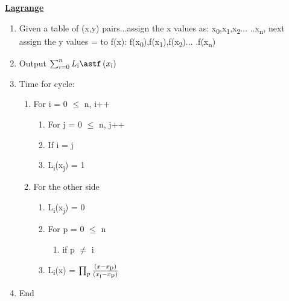 \documentclass[12pt]{article}
\renewcommand{\_}{\kern-1.5pt\textunderscore\kern-1.5pt}
\begin{document}
\textbf{\uline{Lagrange }}\par


\vspace{\baselineskip}
\begin{enumerate}
	\item Given a table of (x,y) pairs...assign the x values as:  x\textsubscript{0},x\textsubscript{1},x\textsubscript{2}$ \ldots $ ..x\textsubscript{n}, next assign the y values = to f(x):  f(x\textsubscript{0}),f(x\textsubscript{1}),f(x\textsubscript{2})$ \ldots $ .f(x\textsubscript{n})\par

	\item Output  \(  \sum _{i=0}^{n}L\textsubscript{i}\astf \left( x\textsubscript{i} \right)  \) \par

	\item Time for cycle:\tab \par

\begin{enumerate}
	\item For i = 0 $ \leq $  n, i++\par

\begin{enumerate}
	\item For j = 0 $ \leq $  n, j++\par

	\item If i = j\par

	\item L\textsubscript{i}(x\textsubscript{j}) = 1\par


\end{enumerate}
	\item For the other side\par

\begin{enumerate}
	\item L\textsubscript{i}(x\textsubscript{j}) = 0\par

	\item For p = 0 $ \leq $  n \par

\begin{enumerate}
	\item if p $ \neq $  i \par


\end{enumerate}
	\item L\textsubscript{i}(x) =  \(  \prod_{p}^{}\frac{(x-x\textsubscript{p})}{(x\textsubscript{i}-x\textsubscript{p})} \) \par


\end{enumerate}
\end{enumerate}
	\item End 
\end{enumerate}\par


\printbibliography
\end{document}
